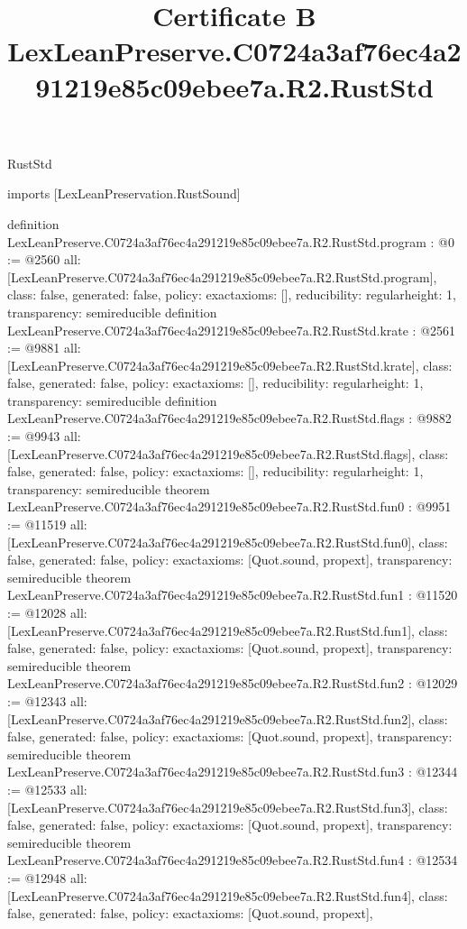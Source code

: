 \begin{lexlean}{RustStd}
\title{Certificate B LexLeanPreserve.C0724a3af76ec4a291219e85c09ebee7a.R2.RustStd}
\begin{coremodule}
imports [LexLeanPreservation.RustSound]

definition LexLeanPreserve.C0724a3af76ec4a291219e85c09ebee7a.R2.RustStd.program : @0 := @2560 {
  all: [LexLeanPreserve.C0724a3af76ec4a291219e85c09ebee7a.R2.RustStd.program],
  class: false,
  generated: false,
  policy: exact{axioms: []},
  reducibility: regular{height: 1},
  transparency: semireducible
}
definition LexLeanPreserve.C0724a3af76ec4a291219e85c09ebee7a.R2.RustStd.krate : @2561 := @9881 {
  all: [LexLeanPreserve.C0724a3af76ec4a291219e85c09ebee7a.R2.RustStd.krate],
  class: false,
  generated: false,
  policy: exact{axioms: []},
  reducibility: regular{height: 1},
  transparency: semireducible
}
definition LexLeanPreserve.C0724a3af76ec4a291219e85c09ebee7a.R2.RustStd.flags : @9882 := @9943 {
  all: [LexLeanPreserve.C0724a3af76ec4a291219e85c09ebee7a.R2.RustStd.flags],
  class: false,
  generated: false,
  policy: exact{axioms: []},
  reducibility: regular{height: 1},
  transparency: semireducible
}
theorem LexLeanPreserve.C0724a3af76ec4a291219e85c09ebee7a.R2.RustStd.fun0 : @9951 := @11519 {
  all: [LexLeanPreserve.C0724a3af76ec4a291219e85c09ebee7a.R2.RustStd.fun0],
  class: false,
  generated: false,
  policy: exact{axioms: [Quot.sound, propext]},
  transparency: semireducible
}
theorem LexLeanPreserve.C0724a3af76ec4a291219e85c09ebee7a.R2.RustStd.fun1 : @11520 := @12028 {
  all: [LexLeanPreserve.C0724a3af76ec4a291219e85c09ebee7a.R2.RustStd.fun1],
  class: false,
  generated: false,
  policy: exact{axioms: [Quot.sound, propext]},
  transparency: semireducible
}
theorem LexLeanPreserve.C0724a3af76ec4a291219e85c09ebee7a.R2.RustStd.fun2 : @12029 := @12343 {
  all: [LexLeanPreserve.C0724a3af76ec4a291219e85c09ebee7a.R2.RustStd.fun2],
  class: false,
  generated: false,
  policy: exact{axioms: [Quot.sound, propext]},
  transparency: semireducible
}
theorem LexLeanPreserve.C0724a3af76ec4a291219e85c09ebee7a.R2.RustStd.fun3 : @12344 := @12533 {
  all: [LexLeanPreserve.C0724a3af76ec4a291219e85c09ebee7a.R2.RustStd.fun3],
  class: false,
  generated: false,
  policy: exact{axioms: [Quot.sound, propext]},
  transparency: semireducible
}
theorem LexLeanPreserve.C0724a3af76ec4a291219e85c09ebee7a.R2.RustStd.fun4 : @12534 := @12948 {
  all: [LexLeanPreserve.C0724a3af76ec4a291219e85c09ebee7a.R2.RustStd.fun4],
  class: false,
  generated: false,
  policy: exact{axioms: [Quot.sound, propext]},
}
\end{coremodule}
\end{lexlean}
